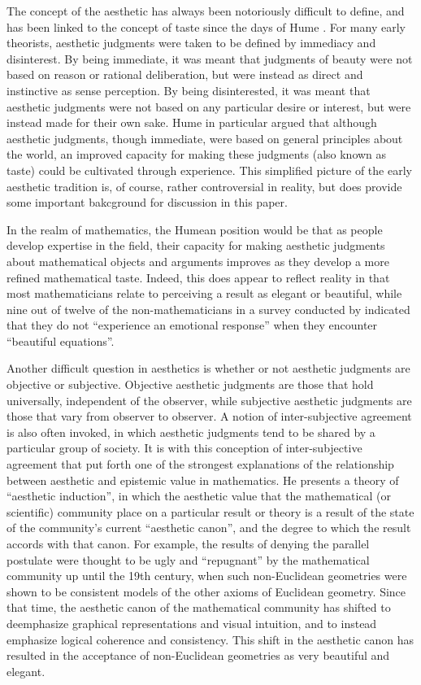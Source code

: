 \documentclass[a4paper,man,natbib]{apa6}
\begin{document}
The concept of the aesthetic has always been notoriously difficult to define, and has been linked to the concept
of taste since the days of Hume \citep{sep-aesthetic-concept}. For many early theorists, aesthetic
judgments were taken to be defined by immediacy and disinterest. By being immediate, it was meant that judgments
of beauty were not based on reason or rational deliberation, but were instead as direct and instinctive as
sense perception. By being disinterested, it was meant that aesthetic judgments were not based on any particular
desire or interest, but were instead made for their own sake. Hume in particular argued that although aesthetic
judgments, though immediate, were based on general principles about the world, an improved capacity for making
these judgments (also known as taste) could be cultivated through experience. This simplified picture of the
early aesthetic tradition is, of course, rather controversial in reality, but does provide some important
bakcground for discussion in this paper.

In the realm of mathematics, the Humean position would be that as people develop expertise in the field, 
their capacity for making aesthetic judgments about mathematical objects and arguments improves 
as they develop a more refined mathematical taste. Indeed, this does appear to reflect reality in that
most mathematicians relate to perceiving a result as elegant or beautiful, while nine out of twelve of the
non-mathematicians in a survey conducted by \cite{zeki_experience_2014} indicated that they do not
``experience an emotional response'' when they encounter ``beautiful equations''. 

Another difficult question in aesthetics is whether or not aesthetic judgments are objective or subjective.
Objective aesthetic judgments are those that hold universally, independent of the observer, while subjective
aesthetic judgments are those that vary from observer to observer. A notion of inter-subjective agreement
is also often invoked, in which aesthetic judgments tend to be shared by a particular group of society. It is
with this conception of inter-subjective agreement that \cite{mcallister_mathematical_2005} put forth one
of the strongest explanations of the relationship between aesthetic and epistemic value in mathematics. He
presents a theory of ``aesthetic induction'', in which the aesthetic value that the mathematical (or scientific)
community place on a particular result or theory is a result of the state of the community's current ``aesthetic
canon'', and the degree to which the result accords with that canon. For example, the results of denying the 
parallel postulate were thought to be ugly and ``repugnant'' by the mathematical community up until the 19th 
century, when such non-Euclidean geometries were shown to be consistent models of the other axioms of Euclidean
geometry. Since that time, the aesthetic canon of the mathematical community has shifted to deemphasize graphical
representations and visual intuition, and to instead emphasize logical coherence and consistency. This shift
in the aesthetic canon has resulted in the acceptance of non-Euclidean geometries as very beautiful and elegant.
\end{document}
